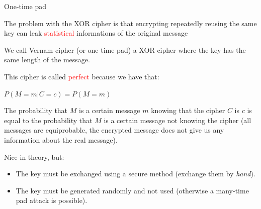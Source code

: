 \begin{frame}{One-time pad}

  \pause

  The problem with the XOR cipher is that encrypting repeatedly reusing the same key can leak \textcolor{red}{statistical} informations of the original message  
  
  \medskip
  
  We call Vernam cipher (or one-time pad) a XOR cipher where the key has the same length of the message. 
  
  \smallskip
  
  This cipher is called \textcolor{red}{perfect} because we have that:
  
  \medskip
  
  $P(M = m | C = c) = P(M = m)$
  
  \medskip
  
  The probability that $M$ is a certain message $m$ knowing that the cipher $C$ is $c$ is equal to the probability that $M$ is a certain message not knowing the cipher (all messages are equiprobable, the encrypted message does not give us any information about the real message).
  
  \medskip
  
  \pause

  Nice in theory, but:
  
  \begin{itemize}
    \item The key must be exchanged using a secure method (exchange them by \textit{hand}).
    \item The key must be generated randomly and not used (otherwise a many-time pad attack is possible).
  \end{itemize}

\end{frame}

